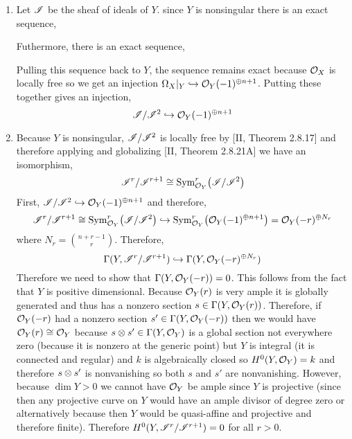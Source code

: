 \documentclass[12pt]{article}
\begin{document}
\begin{enumerate}
\item Let $\mathscr{I}$ be the sheaf of ideals of $Y$. since $Y$ is nonsingular there is an exact sequence,
\begin{center}
\end{center}
Futhermore, there is an exact sequence,
\begin{center}
\end{center}
Pulling this sequence back to $Y$, the sequence remains exact because $\mathcal{O}_{X}$ is locally free so we get an injection $\Omega_X |_Y \hookrightarrow \mathcal{O}_{Y}(-1)^{\oplus n + 1}$. Putting these together gives an injection,
\[ \mathscr{I}/\mathscr{I}^2 \hookrightarrow \mathcal{O}_{Y}(-1)^{\oplus n + 1} \]

\item Because $Y$ is nonsingular, $\mathscr{I}/\mathscr{I}^2$ is locally free by [II, Theorem 2.8.17] and therefore applying and globalizing [II, Theorem 2.8.21A] we have an isomorphism,
\[ \mathscr{I}^r / \mathscr{I}^{r+1} \cong  \mathrm{Sym}^{r}_{\mathcal{O}_{Y}}\! \left( \mathscr{I}/\mathscr{I}^2 \right) \]
First, $\mathscr{I} / \mathscr{I}^2 \hookrightarrow \mathcal{O}_{Y}(-1)^{\oplus n + 1}$ and therefore,
\[ \mathscr{I}^r / \mathscr{I}^{r+1} \cong \mathrm{Sym}^{r}_{\mathcal{O}_{Y}}\! \left( \mathscr{I} / \mathscr{I}^2 \right) \hookrightarrow \mathrm{Sym}^{r}_{\mathcal{O}_{Y}}\! \left( \mathcal{O}_{Y}(-1)^{\oplus n+1} \right) = \mathcal{O}_{Y}(-r)^{\oplus N_r} \]
where $N_r = { n + r - 1 \choose r }$. Therefore,
\[ \Gamma(Y, \mathscr{I}^r/\mathscr{I}^{r+1}) \hookrightarrow \Gamma(Y, \mathcal{O}_{Y}(-r)^{\oplus N_r}) \]
Therefore we need to show that $\Gamma(Y, \mathcal{O}_{Y}(-r)) = 0$. This follows from the fact that $Y$ is positive dimensional. Because $\mathcal{O}_{Y}(r)$ is very ample it is globally generated and thus has a nonzero section $s \in \Gamma(Y, \mathcal{O}_{Y}(r))$. Therefore, if $\mathcal{O}_{Y}(-r)$ had a nonzero section $s' \in \Gamma(Y, \mathcal{O}_{Y}(-r))$ then we would have $\mathcal{O}_{Y}(r) \cong \mathcal{O}_{Y}$ because $s \otimes s' \in \Gamma(Y, \mathcal{O}_{Y})$ is a global section not everywhere zero (because it is nonzero at the generic point) but $Y$ is integral (it is connected and regular) and $k$ is algebraically closed so $H^0(Y, \mathcal{O}_{Y}) = k$ and therefore $s \otimes s'$ is nonvanishing so both $s$ and $s'$ are nonvanishing. However, because $\dim{Y} > 0$ we cannot have $\mathcal{O}_{Y}$ be ample since $Y$ is projective (since then any projective curve on $Y$ would have an ample divisor of degree zero or alternatively because then $Y$ would be quasi-affine and projective and therefore finite). Therefore $H^0(Y, \mathscr{I}^r / \mathscr{I}^{r+1}) = 0$ for all $r > 0$. 


\end{enumerate}
\end{document}
